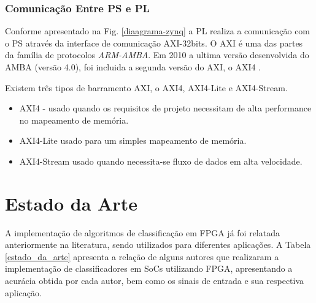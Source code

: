 \subsubsection{Comunicação Entre PS e PL}
Conforme apresentado na Fig. \ref{diaagrama-zynq} a PL realiza a comunicação com 
o PS através da interface de comunicação AXI-32bits. O AXI é uma das partes da família de protocolos \textit{ARM-AMBA}. Em 2010 a ultima versão desenvolvida do AMBA (versão 4.0), foi incluida a segunda versão do AXI, o AXI4 \cite{user-guide-axi}.

Existem três tipos de barramento AXI, o AXI4, AXI4-Lite e AXI4-Stream.

\begin{itemize}
	\item AXI4 - usado quando os requisitos de projeto necessitam de alta performance no mapeamento de memória.
	\item AXI4-Lite usado para um simples mapeamento de memória.
	\item AXI4-Stream usado quando necessita-se fluxo de dados em alta velocidade.
\end{itemize}


\section{Estado da Arte}
A implementação de algoritmos de classificação em FPGA já foi relatada anteriormente na literatura, sendo utilizados para diferentes aplicações. A Tabela \ref{estado_da_arte} apresenta a relação de alguns autores que realizaram a implementação de classificadores em SoCs utilizando FPGA, apresentando a acurácia obtida por cada autor, bem como os sinais de entrada e sua respectiva aplicação.
\newpage

